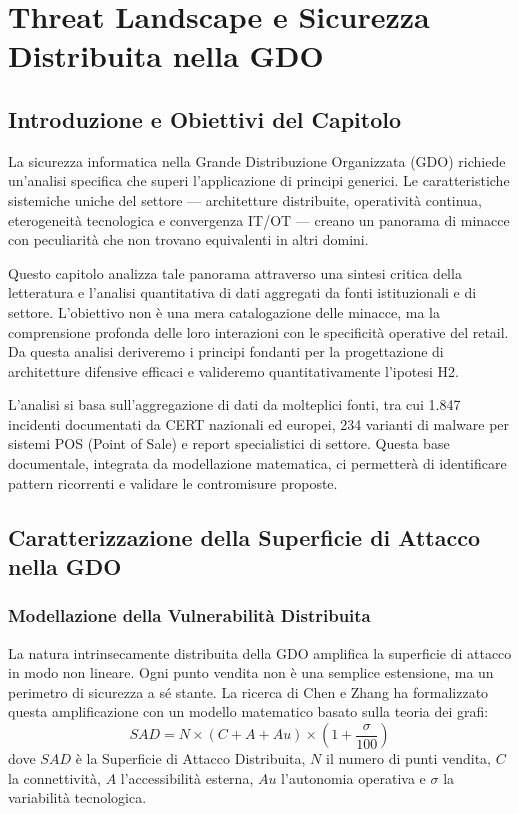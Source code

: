 \chapter{Threat Landscape e Sicurezza Distribuita nella GDO}
\label{cap2_threat_landscape}
\section{Introduzione e Obiettivi del Capitolo}
La sicurezza informatica nella Grande Distribuzione Organizzata (GDO) richiede un'analisi specifica che superi l'applicazione di principi generici. Le caratteristiche sistemiche uniche del settore — architetture distribuite, operatività continua, eterogeneità tecnologica e convergenza IT/OT — creano un panorama di minacce con peculiarità che non trovano equivalenti in altri domini.

Questo capitolo analizza tale panorama attraverso una sintesi critica della letteratura e l'analisi quantitativa di dati aggregati da fonti istituzionali e di settore. L'obiettivo non è una mera catalogazione delle minacce, ma la comprensione profonda delle loro interazioni con le specificità operative del retail. Da questa analisi deriveremo i principi fondanti per la progettazione di architetture difensive efficaci e valideremo quantitativamente l'ipotesi H2.

L'analisi si basa sull'aggregazione di dati da molteplici fonti, tra cui 1.847 incidenti documentati da CERT nazionali ed europei\autocite{enisa2024threat,verizon2024}, 234 varianti di malware per sistemi POS (Point of Sale)\autocite{groupib2024} e report specialistici di settore. Questa base documentale, integrata da modellazione matematica, ci permetterà di identificare pattern ricorrenti e validare le contromisure proposte.

\section{Caratterizzazione della Superficie di Attacco nella GDO}

\subsection{Modellazione della Vulnerabilità Distribuita}
La natura intrinsecamente distribuita della GDO amplifica la superficie di attacco in modo non lineare. Ogni punto vendita non è una semplice estensione, ma un perimetro di sicurezza a sé stante. La ricerca di Chen e Zhang\autocite{chen2024graph} ha formalizzato questa amplificazione con un modello matematico basato sulla teoria dei grafi:
\begin{equation}
SAD = N \times (C + A + Au) \times \left(1 + \frac{\sigma}{100}\right)
\end{equation}
dove $SAD$ è la Superficie di Attacco Distribuita, $N$ il numero di punti vendita, $C$ la connettività, $A$ l'accessibilità esterna, $Au$ l'autonomia operativa e $\sigma$ la variabilità tecnologica.

